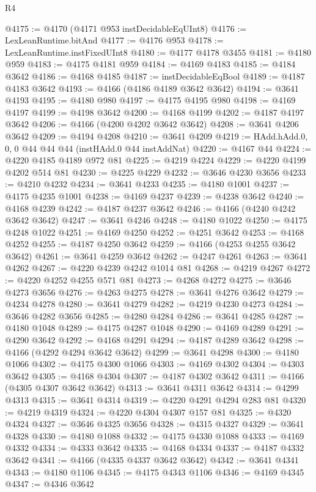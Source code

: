 \begin{lexlean}{R4}
\begin{coremodule}
@4175 := @4170 (@4171 @953 instDecidableEqUInt8)
@4176 := LexLeanRuntime.bitAnd
@4177 := @4176 @953
@4178 := LexLeanRuntime.instFixedUInt8
@4180 := @4177 @4178 @3455
@4181 := @4180 @959
@4183 := @4175 @4181 @959
@4184 := @4169 @4183
@4185 := @4184 @3642
@4186 := @4168 @4185
@4187 := instDecidableEqBool
@4189 := @4187 @4183 @3642
@4193 := @4166 (@4186 @4189 @3642 @3642)
@4194 := @3641 @4193
@4195 := @4180 @980
@4197 := @4175 @4195 @980
@4198 := @4169 @4197
@4199 := @4198 @3642
@4200 := @4168 @4199
@4202 := @4187 @4197 @3642
@4206 := @4166 (@4200 @4202 @3642 @3642)
@4208 := @3641 @4206 @3642
@4209 := @4194 @4208
@4210 := @3641 @4209
@4219 := HAdd.hAdd.{0, 0, 0} @44 @44 @44 (instHAdd.{0} @44 instAddNat)
@4220 := @4167 @44
@4224 := @4220 @4185 @4189 @972 @81
@4225 := @4219 @4224
@4229 := @4220 @4199 @4202 @514 @81
@4230 := @4225 @4229
@4232 := @3646 @4230 @3656
@4233 := @4210 @4232
@4234 := @3641 @4233
@4235 := @4180 @1001
@4237 := @4175 @4235 @1001
@4238 := @4169 @4237
@4239 := @4238 @3642
@4240 := @4168 @4239
@4242 := @4187 @4237 @3642
@4246 := @4166 (@4240 @4242 @3642 @3642)
@4247 := @3641 @4246
@4248 := @4180 @1022
@4250 := @4175 @4248 @1022
@4251 := @4169 @4250
@4252 := @4251 @3642
@4253 := @4168 @4252
@4255 := @4187 @4250 @3642
@4259 := @4166 (@4253 @4255 @3642 @3642)
@4261 := @3641 @4259 @3642
@4262 := @4247 @4261
@4263 := @3641 @4262
@4267 := @4220 @4239 @4242 @1014 @81
@4268 := @4219 @4267
@4272 := @4220 @4252 @4255 @571 @81
@4273 := @4268 @4272
@4275 := @3646 @4273 @3656
@4276 := @4263 @4275
@4278 := @3641 @4276 @3642
@4279 := @4234 @4278
@4280 := @3641 @4279
@4282 := @4219 @4230 @4273
@4284 := @3646 @4282 @3656
@4285 := @4280 @4284
@4286 := @3641 @4285
@4287 := @4180 @1048
@4289 := @4175 @4287 @1048
@4290 := @4169 @4289
@4291 := @4290 @3642
@4292 := @4168 @4291
@4294 := @4187 @4289 @3642
@4298 := @4166 (@4292 @4294 @3642 @3642)
@4299 := @3641 @4298
@4300 := @4180 @1066
@4302 := @4175 @4300 @1066
@4303 := @4169 @4302
@4304 := @4303 @3642
@4305 := @4168 @4304
@4307 := @4187 @4302 @3642
@4311 := @4166 (@4305 @4307 @3642 @3642)
@4313 := @3641 @4311 @3642
@4314 := @4299 @4313
@4315 := @3641 @4314
@4319 := @4220 @4291 @4294 @283 @81
@4320 := @4219 @4319
@4324 := @4220 @4304 @4307 @157 @81
@4325 := @4320 @4324
@4327 := @3646 @4325 @3656
@4328 := @4315 @4327
@4329 := @3641 @4328
@4330 := @4180 @1088
@4332 := @4175 @4330 @1088
@4333 := @4169 @4332
@4334 := @4333 @3642
@4335 := @4168 @4334
@4337 := @4187 @4332 @3642
@4341 := @4166 (@4335 @4337 @3642 @3642)
@4342 := @3641 @4341
@4343 := @4180 @1106
@4345 := @4175 @4343 @1106
@4346 := @4169 @4345
@4347 := @4346 @3642

\end{coremodule}
\end{lexlean}
